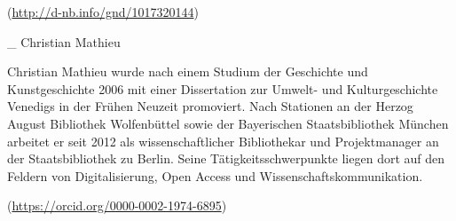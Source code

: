 \documentclass[a4paper,
fontsize=11pt,
oneside,
numbers=noperiodatend,
parskip=half-,
bibliography=totoc,
final
]{scrartcl}
\begin{document}
(\url{http://d-nb.info/gnd/1017320144})

\_ Christian Mathieu

Christian Mathieu wurde nach einem Studium der Geschichte und
Kunstgeschichte 2006 mit einer Dissertation zur Umwelt- und
Kulturgeschichte Venedigs in der Frühen Neuzeit promoviert. Nach
Stationen an der Herzog August Bibliothek Wolfenbüttel sowie der
Bayerischen Staatsbibliothek München arbeitet er seit 2012 als
wissenschaftlicher Bibliothekar und Projektmanager an der
Staatsbibliothek zu Berlin. Seine Tätigkeitsschwerpunkte liegen dort auf
den Feldern von Digitalisierung, Open Access und
Wissenschaftskommunikation.

(\url{https://orcid.org/0000-0002-1974-6895})
\end{document}
